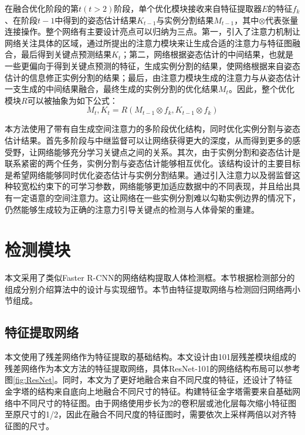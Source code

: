 在融合优化阶段的第$t(t>2)$阶段，单个优化模块接收来自特征提取器$E$的特征$f_k$、在阶段$t-1$中得到的姿态估计结果$K_{t-1}$与实例分割结果$M_{t-1}$，其中$\otimes$代表张量连接操作。整个网络有主要设计亮点可以归纳为三点。第一，引入了注意力机制让网络关注具体的区域，通过所提出的注意力模块来让生成合适的注意力与特征图融合，最后得到关键点预测结果$K_t$；第二，网络根据姿态估计的中间结果，也就是一些更偏向于得到关键点预测的特征，生成实例分割的结果，使网络根据来自姿态估计的信息修正实例分割的结果；最后，由注意力模块生成的注意力与从姿态估计一支生成的中间结果融合，最终生成的实例分割的优化结果$M_t$。因此，整个优化模块$R$可以被抽象为如下公式：
\begin{equation}
\label{def:refinenet}
M_t, K_t = R(M_{t-1}\otimes f_k, K_{t-1}\otimes f_k)
\end{equation}

本方法使用了带有自生成空间注意力的多阶段优化结构，同时优化实例分割与姿态估计结果。首先多阶段与中继监督可以让网络获得更大的深度，从而得到更多的感受野，让网络能够充分学习关键点之间的关系\cite{wei2016convolutional}。其次，由于实例分割和姿态估计是联系紧密的两个任务，实例分割与姿态估计能够相互优化。该结构设计的主要目标是希望网络能够同时优化姿态估计与实例分割结果。通过引入注意力以及弱监督这种较宽松约束下的可学习参数，网络能够更加适应数据中的不同表现，并且给出具有一定语意的空间注意力\cite{wang2017residual}。这让网络在一些实例分割难以勾勒实例边界的情况下， 仍然能够生成较为正确的注意力引导关键点的检测与人体骨架的重建。

\section{检测模块}
\label{sec:detectionstage}
本文采用了类似Faster R-CNN\cite{Ren2015Faster}的网络结构提取人体检测框。本节根据检测部分的组成分别介绍算法中的设计与实现细节。本节由特征提取网络与检测回归网络两小节组成。

\subsection{特征提取网络}
\label{subsec:featextract}
本文使用了残差网络作为特征提取的基础结构。本文设计由101层残差模块组成的残差网络作为本文方法的特征提取网络，具体ResNet-101的网络结构布局可以参考图\ref{fig:ResNet}。同时，本文为了更好地融合来自不同尺度的特征，还设计了特征金字塔\cite{Lin2016Feature}的结构来自底向上地融合不同尺寸的特征。构建特征金字塔需要来自基础网络中不同尺寸的特征图。由于网络使用步长为2的卷积层或池化层每次缩小特征图至原尺寸的1/2，因此在融合不同尺度的特征图时，需要依次上采样两倍以对齐特征图的尺寸。

